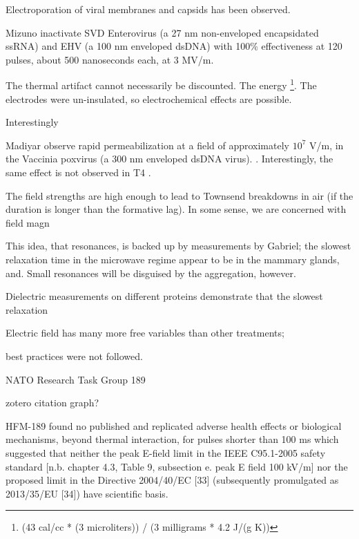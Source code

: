 \documentclass[paper.tex]{subfiles}
\begin{document}
\begin{multicols}{1}
Electroporation of viral membranes and capsids has been observed.

Mizuno \cite{Inactivation1990} inactivate SVD Enterovirus (a 27 nm non-enveloped encapsidated ssRNA) and EHV (a 100 nm enveloped dsDNA) with 100\% effectiveness at 120 pulses, about 500 nanoseconds each, at 3 MV/m. 

The thermal artifact cannot necessarily be discounted. The energy \footnote{(43 cal/cc * (3 microliters)) / (3 milligrams * 4.2 J/(g K))}. The electrodes were un-insulated, so electrochemical effects are possible.

Interestingly


Madiyar observe rapid permeabilization at a field of approximately $10^7$ V/m, in the Vaccinia poxvirus (a 300 nm enveloped dsDNA virus). \cite{AC2017}. Interestingly, the same effect is not observed in T4 \cite{Manipulation2013}. 


The field strengths are high enough to lead to Townsend breakdowns in air (if the duration is longer than the formative lag). In some sense, we are concerned with field magn

This idea, that resonances, is backed up by measurements by Gabriel; the slowest relaxation time in the microwave regime appear to be in the mammary glands, and. Small resonances will be disguised by the aggregation, however.


Dielectric measurements on different proteins demonstrate that the slowest relaxation 








Electric field has many more free variables than other treatments; 



best practices were not followed.



NATO Research Task Group 189 \cite{treatyelectromagnetic}

zotero citation graph?

\begin{fquote}
HFM-189 found no published and replicated adverse health effects or biological mechanisms, beyond
thermal interaction, for pulses shorter than 100 ms which suggested that neither the peak E-field limit in the
IEEE C95.1-2005 safety standard [n.b. chapter 4.3, Table 9, subsection e. peak E field 100 kV/m] nor the proposed limit in the Directive 2004/40/EC [33] (subsequently promulgated as 2013/35/EU [34]) have scientific basis. 
\end{fquote}



\end{multicols}
\end{document}
